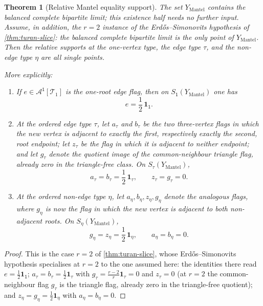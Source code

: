 \documentclass[11pt]{article}
\newtheorem{theorem}{Theorem}
\theoremstyle{definition}
\newcommand{\A}{\mathcal{A}}
\newcommand{\T}{\mathcal{T}}
\newcommand{\one}{\mathbf 1}
\newcommand{\vtype}{\mathsf{1}}
\begin{document}
\begin{theorem}[Relative Mantel equality support]\label{thm:relative-mantel}
The set $Y_{\mathrm{Mantel}}$ contains the balanced complete bipartite limit; this
existence half needs no further input.  Assume, in addition, the $r=2$ instance of the
Erd\H{o}s--Simonovits hypothesis of \cref{thm:turan-slice}: the balanced complete
bipartite limit is the \emph{only} point of $Y_{\mathrm{Mantel}}$.  Then the relative
supports at the one-vertex type, the edge type $\tau$, and the non-edge type $\eta$ are
all single points.

More explicitly:
\begin{enumerate}[label=\textup{(\roman*)}, leftmargin=2.5em]
  \item If $e\in\A^{\vtype}[\T_1]$ is the one-root edge flag, then on
        $S_{\vtype}(Y_{\mathrm{Mantel}})$ one has
        \[
          e=\frac12\,\one_{\vtype} .
        \]
  \item At the ordered edge type $\tau$, let $a_\tau$ and $b_\tau$ be the two
        three-vertex flags in which the new vertex is adjacent to exactly the first,
        respectively exactly the second, root endpoint; let $z_\tau$ be the flag in
        which it is adjacent to neither endpoint; and let $g_\tau$ denote the quotient
        image of the common-neighbour triangle flag, already zero in the triangle-free
        class.  On $S_\tau(Y_{\mathrm{Mantel}})$,
        \[
          a_\tau=b_\tau=\frac12\,\one_\tau,
          \qquad
          z_\tau=g_\tau=0 .
        \]
  \item At the ordered non-edge type $\eta$, let $a_\eta,b_\eta,z_\eta,g_\eta$ denote the
        analogous flags, where $g_\eta$ is now the flag in which the new vertex is
        adjacent to both non-adjacent roots.  On $S_\eta(Y_{\mathrm{Mantel}})$,
        \[
          g_\eta=z_\eta=\frac12\,\one_\eta,
          \qquad
          a_\eta=b_\eta=0 .
        \]
\end{enumerate}
\end{theorem}

\begin{proof}
This is the case $r=2$ of \cref{thm:turan-slice}, whose Erd\H{o}s--Simonovits
hypothesis specialises at $r=2$ to the one assumed here: the identities there read
$e=\frac12\one_{\vtype}$; $a_\tau=b_\tau=\frac12\one_\tau$ with
$g_\tau=\frac{r-2}{r}\one_\tau=0$ and $z_\tau=0$ (at $r=2$ the common-neighbour flag
$g_\tau$ is the triangle flag, already zero in the triangle-free quotient); and
$z_\eta=g_\eta=\frac12\one_\eta$ with $a_\eta=b_\eta=0$.
\end{proof}
\end{document}
